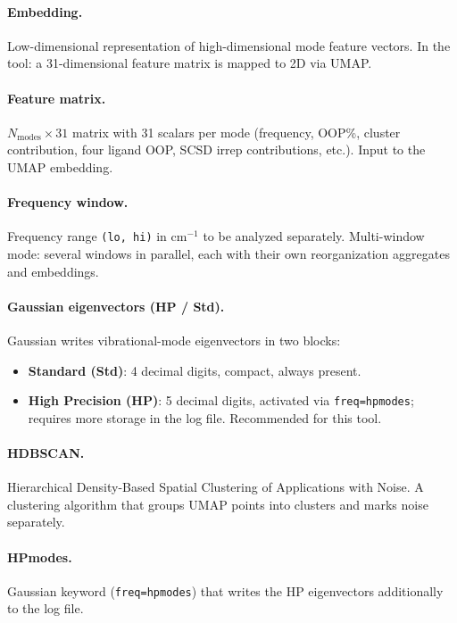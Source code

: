 \documentclass[11pt,a4paper,twoside]{article}
\theoremstyle{remark}
\begin{document}
\paragraph{Embedding.}
Low-dimensional representation of high-dimensional mode feature
vectors. In the tool: a 31-dimensional feature matrix is mapped to
2D via UMAP.

\paragraph{Feature matrix.}
$N_\text{modes} \times 31$ matrix with 31 scalars per mode
(frequency, OOP\%, cluster contribution, four ligand OOP, SCSD
irrep contributions, etc.). Input to the UMAP embedding.

\paragraph{Frequency window.}
Frequency range \texttt{(lo, hi)} in cm$^{-1}$ to be analyzed
separately. Multi-window mode: several windows in parallel, each
with their own reorganization aggregates and embeddings.

\paragraph{Gaussian eigenvectors (HP / Std).}
Gaussian writes vibrational-mode eigenvectors in two blocks:
\begin{itemize}\setlength{\itemsep}{0pt}
  \item \textbf{Standard (Std)}: 4 decimal digits, compact, always
        present.
  \item \textbf{High Precision (HP)}: 5 decimal digits, activated
        via \texttt{freq=hpmodes}; requires more storage in the
        log file. Recommended for this tool.
\end{itemize}

\paragraph{HDBSCAN.}
Hierarchical Density-Based Spatial Clustering of Applications
with Noise. A clustering algorithm that groups UMAP points into
clusters and marks noise separately.

\paragraph{HPmodes.}
Gaussian keyword (\texttt{freq=hpmodes}) that writes the HP
eigenvectors additionally to the log file.
\end{document}
